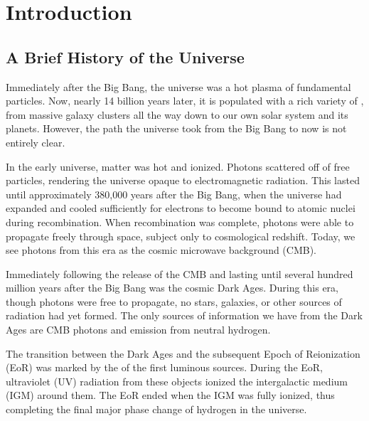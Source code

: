 \documentclass[12pt]{article}
\begin{document}
\clearpage
{}

\begingroup
\hypersetup{
	colorlinks=true,
	citecolor=DarkBlue,
	filecolor=black,
	linkcolor=black,
	urlcolor=DarkBlue
}
\tableofcontents
\listoffigures
\listoftables
\endgroup
\newpage

\begin{abstract}
\end{abstract}

\clearpage
{}

\section{Introduction} \label{sec:intro}

\subsection{A Brief History of the Universe} \label{subsec:universe}

Immediately after the Big Bang, the universe was a hot plasma of fundamental particles. Now, nearly 14 billion years later, it is populated with a rich variety of , from massive galaxy clusters all the way down to our own solar system and its planets. However, the  path the universe took from the Big Bang to now is not entirely clear.

In the early universe, matter was hot and ionized. Photons scattered off of free particles, rendering the universe opaque to electromagnetic radiation. This lasted until approximately 380,000 years after the Big Bang, when the universe had expanded and cooled sufficiently for electrons to become bound to atomic nuclei during recombination. When recombination was complete, photons were able to propagate freely through space, subject only to cosmological redshift. Today, we see photons from this era as the cosmic microwave background (CMB).

Immediately following the release of the CMB and lasting until several hundred million years after the Big Bang was the cosmic Dark Ages. During this era, though photons were free to propagate, no stars, galaxies, or other sources of radiation had yet formed. The only sources of information we have from the Dark Ages are CMB photons and emission from neutral hydrogen.

The transition between the Dark Ages and the subsequent Epoch of Reionization (EoR) was marked by the  of the first luminous sources. During the EoR, ultraviolet (UV) radiation from these objects ionized the intergalactic medium (IGM) around them. The EoR ended when the IGM was fully ionized, thus completing the final major phase change of hydrogen in the universe.
\end{document}
